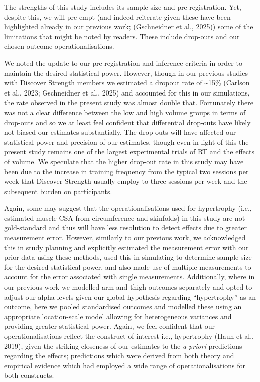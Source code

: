 \documentclass[
]{article}
\begin{document}
The strengths of this study includes its sample size and
pre-registration. Yet, despite this, we will pre-empt (and indeed
reiterate given these have been highlighted already in our previous
work; (Gschneidner et al., 2025)) some of the limitations that might be
noted by readers. These include drop-outs and our chosen outcome
operationalisations.

We noted the update to our pre-registration and inference criteria in
order to maintain the desired statistical power. However, though in our
previous studies with Discover Strength members we estimated a dropout
rate of \textasciitilde15\% (Carlson et al., 2023; Gschneidner et al.,
2025) and accounted for this in our simulations, the rate observed in
the present study was almost double that. Fortunately there was not a
clear difference between the low and high volume groups in terms of
drop-outs and so we at least feel confident that differential drop-outs
have likely not biased our estimates substantially. The drop-outs will
have affected our statistical power and precision of our estimates,
though even in light of this the present study remains one of the
largest experimental trials of RT and the effects of volume. We
speculate that the higher drop-out rate in this study may have been due
to the increase in training frequency from the typical two sessions per
week that Discover Strength usually employ to three sessions per week
and the subsequent burden on participants.

Again, some may suggest that the operationalisations used for
hypertrophy (i.e., estimated muscle CSA from circumference and
skinfolds) in this study are not gold-standard and thus will have less
resolution to detect effects due to greater measurement error. However,
similarly to our previous work, we acknowledged this in study planning
and explicitly estimated the measurement error with our prior data using
these methods, used this in simulating to determine sample size for the
desired statistical power, and also made use of multiple measurements to
account for the error associated with single measurements. Additionally,
where in our previous work we modelled arm and thigh outcomes separately
and opted to adjust our alpha levels given our global hypothesis
regarding ``hypertrophy'' as an outcome, here we pooled standardised
outcomes and modelled these using an appropriate location-scale model
allowing for heterogeneous variances and providing greater statistical
power. Again, we feel confident that our operationalisations reflect the
construct of interest i.e., hypertrophy (Haun et al., 2019), given the
striking closeness of our estimates to the \emph{a priori} predictions
regarding the effects; predictions which were derived from both theory
and empirical evidence which had employed a wide range of
operationalisations for both constructs.
\end{document}
